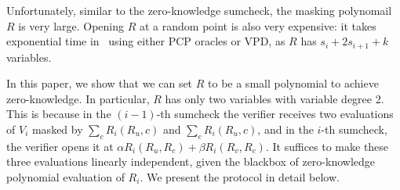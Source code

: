 Unfortunately, similar to the zero-knowledge sumcheck, the masking polynomail $R$ is very large. Opening $R$ at a random point is also very expensive: it takes exponential time in~\cite{zksumcheck} using either PCP oracles or VPD, as $R$ has $s_i+2s_{i+1}+k$ variables.

In this paper, we show that we can set $R$ to be a small polynomial to achieve zero-knowledge. In particular, $R$ has only two variables with variable degree 2. This is because in the $(i-1)$-th sumcheck the verifier receives two evaluations of $V_i$ masked by $\sum_{c}R_i(R_u,c)$ and $\sum_{c}R_i(R_u,c)$, and in the $i$-th sumcheck, the verifier opens it at $\alpha R_i(R_u,R_c)+\beta R_i(R_v,R_c)$. It suffices to make these three evaluations linearly independent, given the blackbox of zero-knowledge polynomial evaluation of $R_i$. We present the protocol in detail below.



